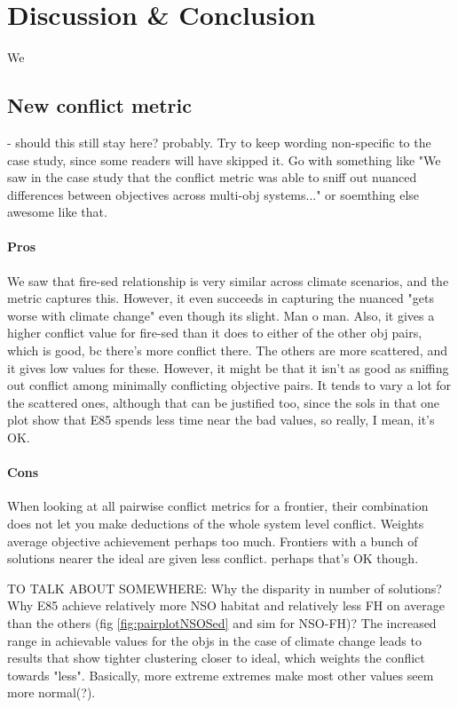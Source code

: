 \section{Discussion \& Conclusion}
We 

\subsection{New conflict metric} - should this still stay here? probably. Try to keep wording non-specific to the case study, since some readers will have skipped it. Go with something like "We saw in the case study that the conflict metric was able to sniff out nuanced differences between objectives across multi-obj systems..." or soemthing else awesome like that.

\paragraph{Pros}
We saw that fire-sed relationship is very similar across climate scenarios, and the metric captures this. However, it even succeeds in capturing the nuanced "gets worse with climate change" even though its slight. Man o man.
Also, it gives a higher conflict value for fire-sed than it does to either of the other obj pairs, which is good, bc there's more conflict there. The others are more scattered, and it gives low values for these.
However, it might be that it isn't as good as sniffing out conflict among minimally conflicting objective pairs. It tends to vary a lot for the scattered ones, although that can be justified too, since the sols in that one plot show that E85 spends less time near the bad values, so really, I mean, it's OK.

\paragraph{Cons}
When looking at all pairwise conflict metrics for a frontier, their combination does not let you make deductions of the whole system level conflict.
Weights average objective achievement perhaps too much. Frontiers with a bunch of solutions nearer the ideal are given less conflict. perhaps that's OK though.


TO TALK ABOUT SOMEWHERE:
Why the disparity in number of solutions?
Why E85 achieve relatively more NSO habitat and relatively less FH on average than the others (fig \ref{fig:pairplotNSOSed} and sim for NSO-FH)?
The increased range in achievable values for the objs in the case of climate change leads to results that show tighter clustering closer to ideal, which weights the conflict towards "less". Basically, more extreme extremes make most other values seem more normal(?).

